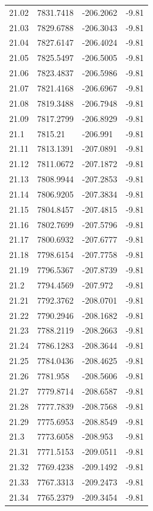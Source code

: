 \begin{table}[H]
\begin{tabular}{llll}
21.02 & 7831.7418 & -206.2062 & -9.81 \\
21.03 & 7829.6788 & -206.3043 & -9.81 \\
21.04 & 7827.6147 & -206.4024 & -9.81 \\
21.05 & 7825.5497 & -206.5005 & -9.81 \\
21.06 & 7823.4837 & -206.5986 & -9.81 \\
21.07 & 7821.4168 & -206.6967 & -9.81 \\
21.08 & 7819.3488 & -206.7948 & -9.81 \\
21.09 & 7817.2799 & -206.8929 & -9.81 \\
21.1 & 7815.21 & -206.991 & -9.81 \\
21.11 & 7813.1391 & -207.0891 & -9.81 \\
21.12 & 7811.0672 & -207.1872 & -9.81 \\
21.13 & 7808.9944 & -207.2853 & -9.81 \\
21.14 & 7806.9205 & -207.3834 & -9.81 \\
21.15 & 7804.8457 & -207.4815 & -9.81 \\
21.16 & 7802.7699 & -207.5796 & -9.81 \\
21.17 & 7800.6932 & -207.6777 & -9.81 \\
21.18 & 7798.6154 & -207.7758 & -9.81 \\
21.19 & 7796.5367 & -207.8739 & -9.81 \\
21.2 & 7794.4569 & -207.972 & -9.81 \\
21.21 & 7792.3762 & -208.0701 & -9.81 \\
21.22 & 7790.2946 & -208.1682 & -9.81 \\
21.23 & 7788.2119 & -208.2663 & -9.81 \\
21.24 & 7786.1283 & -208.3644 & -9.81 \\
21.25 & 7784.0436 & -208.4625 & -9.81 \\
21.26 & 7781.958 & -208.5606 & -9.81 \\
21.27 & 7779.8714 & -208.6587 & -9.81 \\
21.28 & 7777.7839 & -208.7568 & -9.81 \\
21.29 & 7775.6953 & -208.8549 & -9.81 \\
21.3 & 7773.6058 & -208.953 & -9.81 \\
21.31 & 7771.5153 & -209.0511 & -9.81 \\
21.32 & 7769.4238 & -209.1492 & -9.81 \\
21.33 & 7767.3313 & -209.2473 & -9.81 \\
21.34 & 7765.2379 & -209.3454 & -9.81 \\

\end{tabular}
\end{table}
